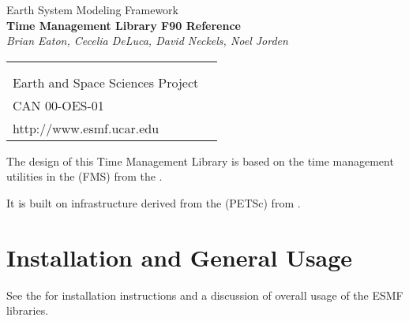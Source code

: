 \documentclass[]{article}
\begin{document}

\begin{titlepage}

\begin{center}
{\Large Earth System Modeling Framework } \\
\vspace{.25in}
{\Large {\bf Time Management Library F90 Reference}} \\
\vspace{.25in}
{\large {\it Brian Eaton, Cecelia DeLuca, David Neckels, Noel Jorden}}
\vspace{.5in}
\end{center}

\begin{latexonly}
\vspace{5.5in}
\begin{tabular}{p{5in}p{.9in}}
\hrulefill \\
\noindent {\bf NASA High Performance Computing and Communications Program} \\
\noindent Earth and Space Sciences Project \\
\noindent CAN 00-OES-01 \\
\noindent http://www.esmf.ucar.edu \\
\end{tabular}
\end{latexonly}

\end{titlepage}

\tableofcontents

\newpage


The design of this Time Management Library is based on the time management 
utilities in the  (FMS) from the 
.

It is built on infrastructure derived from the  (PETSc) 
from .

\section{Installation and General Usage}
See the  for installation instructions and a discussion of overall 
usage of the ESMF libraries.
\end{document}
